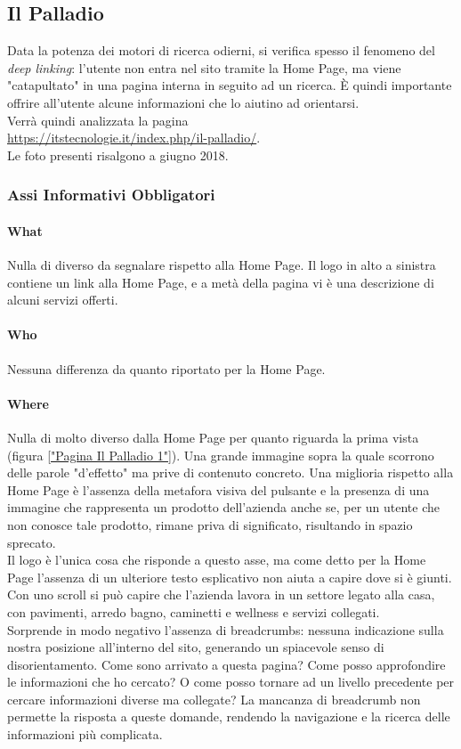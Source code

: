 \subsection{Il Palladio}\label{palladio}
Data la potenza dei motori di ricerca odierni, si verifica spesso il fenomeno del \textit{deep linking}: l'utente non entra nel sito tramite la Home Page, ma viene "catapultato" in una pagina interna in seguito ad un ricerca. È quindi importante offrire all'utente alcune informazioni che lo aiutino ad orientarsi. \\
Verrà quindi analizzata la pagina \\ \url{https://itstecnologie.it/index.php/il-palladio/}.\\ Le foto presenti risalgono a giugno 2018.


\subsubsection{Assi Informativi Obbligatori}
\paragraph{What} 
Nulla di diverso da segnalare rispetto alla Home Page. Il logo in alto a sinistra contiene un link alla Home Page, e a metà della pagina vi è una descrizione di alcuni servizi offerti.
\paragraph{Who}
Nessuna differenza da quanto riportato per la Home Page.
\paragraph{Where}
Nulla di molto diverso dalla Home Page per quanto riguarda la prima vista (figura \ref{"Pagina Il Palladio 1"}). Una grande immagine sopra la quale scorrono delle parole "d'effetto" ma prive di contenuto concreto. Una miglioria rispetto alla Home Page è l'assenza della metafora visiva del pulsante e la presenza di una immagine che rappresenta un prodotto dell'azienda anche se, per un utente che non conosce tale prodotto, rimane priva di significato, risultando in spazio sprecato. \\ Il logo è l'unica cosa che risponde a questo asse, ma come detto per la Home Page l'assenza di un ulteriore testo esplicativo non aiuta a capire dove si è giunti. Con uno scroll si può capire che l'azienda lavora in un settore legato alla casa, con pavimenti, arredo bagno, caminetti e wellness e servizi collegati. \\
Sorprende in modo negativo l'assenza di breadcrumbs: nessuna indicazione sulla nostra posizione all'interno del sito, generando un spiacevole senso di disorientamento. Come sono arrivato a questa pagina? Come posso approfondire le informazioni che ho cercato? O come posso tornare ad un livello precedente per cercare informazioni diverse ma collegate? La mancanza di breadcrumb non permette la risposta a queste domande, rendendo la navigazione e la ricerca delle informazioni più complicata.

